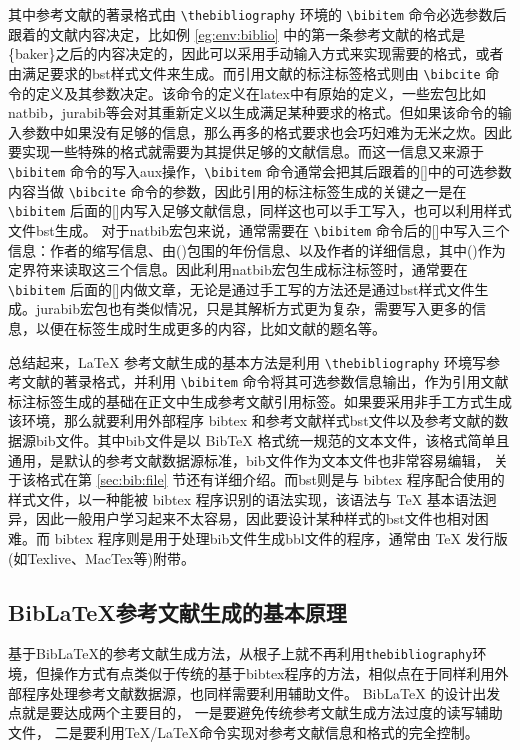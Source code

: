 \documentclass[twoside]{article} %
\begin{document}
其中参考文献的著录格式由 \verb|\thebibliography| 环境的 \verb|\bibitem| 命令必选参数后跟着的文献内容决定，比如例 \ref{eg:env:biblio} 中的第一条参考文献的格式是\{baker\}之后的内容决定的，因此可以采用手动输入方式来实现需要的格式，或者由满足要求的bst样式文件来生成。而引用文献的标注标签格式则由 \verb|\bibcite| 命令的定义及其参数决定。该命令的定义在latex中有原始的定义，一些宏包比如natbib，jurabib等会对其重新定义以生成满足某种要求的格式。但如果该命令的输入参数中如果没有足够的信息，那么再多的格式要求也会巧妇难为无米之炊。因此要实现一些特殊的格式就需要为其提供足够的文献信息。而这一信息又来源于 \verb|\bibitem| 命令的写入aux操作，\verb|\bibitem| 命令通常会把其后跟着的[]中的可选参数内容当做 \verb|\bibcite| 命令的参数，因此引用的标注标签生成的关键之一是在 \verb|\bibitem| 后面的[]内写入足够文献信息，同样这也可以手工写入，也可以利用样式文件bst生成。
对于natbib宏包来说，通常需要在 \verb|\bibitem| 命令后的[]中写入三个信息：作者的缩写信息、由()包围的年份信息、以及作者的详细信息，其中()作为定界符来读取这三个信息。因此利用natbib宏包生成标注标签时，通常要在 \verb|\bibitem| 后面的[]内做文章，无论是通过手工写的方法还是通过bst样式文件生成。jurabib宏包也有类似情况，只是其解析方式更为复杂，需要写入更多的信息，以便在标签生成时生成更多的内容，比如文献的题名等。

总结起来，\LaTeX{} 参考文献生成的基本方法是利用 \verb|\thebibliography| 环境写参考文献的著录格式，并利用 \verb|\bibitem| 命令将其可选参数信息输出，作为引用文献标注标签生成的基础在正文中生成参考文献引用标签。如果要采用非手工方式生成该环境，那么就要利用外部程序 bibtex 和参考文献样式bst文件以及参考文献的数据源bib文件。其中bib文件是以 BibTeX 格式统一规范的文本文件，该格式简单且通用，是默认的参考文献数据源标准，bib文件作为文本文件也非常容易编辑，
关于该格式在第 \ref{sec:bib:file} 节还有详细介绍。而bst则是与 bibtex 程序配合使用的样式文件，以一种能被 bibtex 程序识别的语法实现，该语法与 TeX 基本语法迥异，因此一般用户学习起来不太容易，因此要设计某种样式的bst文件也相对困难。而 bibtex 程序则是用于处理bib文件生成bbl文件的程序，通常由 TeX 发行版(如Texlive、MacTex等)附带。


\subsection{BibLaTeX参考文献生成的基本原理}

基于BibLaTeX的参考文献生成方法，从根子上就不再利用\verb|thebibliography|环境，但操作方式有点类似于传统的基于bibtex程序的方法，相似点在于同样利用外部程序处理参考文献数据源，也同样需要利用辅助文件。
BibLaTeX 的设计出发点就是要达成两个主要目的，
一是要避免传统参考文献生成方法过度的读写辅助文件，
二是要利用TeX/LaTeX命令实现对参考文献信息和格式的完全控制。
\end{document}
